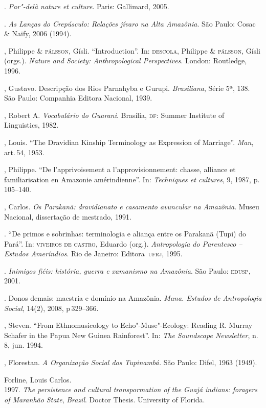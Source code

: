 \begin{bibliohedra}
\titidem. \emph{Par"-delà nature et culture}. Paris: Gallimard, 2005.

\titidem. \emph{As Lanças do Crepúsculo: Relações jívaro na
Alta Amazônia}. São Paulo: Cosac \& Naify, 2006 (1994).

, Philippe \& \textsc{pálsson}, Gísli. ``Introduction''. In: \textsc{descola}, Philippe \& \textsc{pálsson}, Gísli (orgs.). \emph{Nature and Society: Anthropological Perspectives}. London: Routledge, 1996.

, Gustavo. Descripção dos Rios Parnahyba e Gurupi.
\emph{Brasiliana}, Série 5ª, 138. São Paulo: Companhia Editora Nacional, 1939.

, Robert A. \emph{Vocabulário do Guarani}. Brasília, \textsc{df}: Summer
Institute of Linguistics, 1982.

, Louis. ``The Dravidian Kinship Terminology as Expression of
Marriage''. \emph{Man}, art.\,54, 1953.

, Philippe. ``De l'apprivoisement a l'approvisionnement: chasse,
alliance et familiarisation en Amazonie amérindienne''. In:
\emph{Techniques et cultures}, 9, 1987, p.\,105--140.

, Carlos. \emph{Os Parakanã: dravidianato e casamento avuncular na
Amazônia}. Museu Nacional, dissertação de mestrado, 1991.

\titidem. ``De primos e sobrinhas: terminologia e aliança entre os
Parakanã (Tupi) do Pará''. In: \textsc{viveiros de castro}, Eduardo (org.). \emph{Antropologia do Parentesco -- Estudos Ameríndios}. Rio de Janeiro: Editora~\textsc{ufrj}, 1995.

\titidem. \emph{Inimigos fiéis: história, guerra e xamanismo na
Amazônia}. São Paulo: \textsc{edusp}, 2001.

\titidem. Donos demais: maestria e domínio na Amazônia. \emph{Mana.
Estudos de Antropologia Social}, 14(2), 2008, p\,329--366.

, Steven. ``From Ethnomusicology to Echo"-Muse"-Ecology: Reading R.
Murray Schafer in the Papua New Guinea Rainforest''. In: \emph{The Soundscape
Newsletter}, n.\,8, jun. 1994.

, Florestan. \emph{A Organização Social dos Tupinambá.} São
Paulo: Difel, 1963 (1949).

Forline, Louis Carlos.\\
1997. \emph{The persistence and cultural transpormation of the
Guajá indians: foragers of Maranhão State}, \emph{Brazil}. Doctor
Thesis. University of Florida.


\end{bibliohedra}
